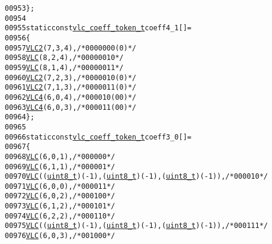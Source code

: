\begin{footnotesize}
\begin{alltt}
00953 \};
00954 
00955 \textcolor{keyword}{static} \textcolor{keyword}{const} \hyperlink{structvlc__coeff__token__t}{vlc_coeff_token_t} coeff4\_1[] = 
00956 \{
00957         \hyperlink{vlc_8h_ad3cda36b9c6132357c7f7de5e52a6c93}{VLC2}(7, 3, 4),   \textcolor{comment}{/* 0000 000(0) */}
00958         \hyperlink{vlc_8h_a7f3572774a720fd9b4bc3b1a0b65082f}{VLC}(8, 2, 4),   \textcolor{comment}{/* 0000 0010 */}
00959         \hyperlink{vlc_8h_a7f3572774a720fd9b4bc3b1a0b65082f}{VLC}(8, 1, 4),   \textcolor{comment}{/* 0000 0011 */}
00960         \hyperlink{vlc_8h_ad3cda36b9c6132357c7f7de5e52a6c93}{VLC2}(7, 2, 3),   \textcolor{comment}{/* 0000 010(0) */}
00961         \hyperlink{vlc_8h_ad3cda36b9c6132357c7f7de5e52a6c93}{VLC2}(7, 1, 3),   \textcolor{comment}{/* 0000 011(0) */}
00962         \hyperlink{vlc_8h_a02cdc921d8f03450b12879e8afb222cb}{VLC4}(6, 0, 4),   \textcolor{comment}{/* 0000 10(00) */}
00963         \hyperlink{vlc_8h_a02cdc921d8f03450b12879e8afb222cb}{VLC4}(6, 0, 3),   \textcolor{comment}{/* 0000 11(00) */}
00964 \};
00965 
00966 \textcolor{keyword}{static} \textcolor{keyword}{const} \hyperlink{structvlc__coeff__token__t}{vlc_coeff_token_t} coeff3\_0[] =
00967 \{
00968         \hyperlink{vlc_8h_a7f3572774a720fd9b4bc3b1a0b65082f}{VLC}(6, 0, 1),    \textcolor{comment}{/* 0000 00 */} 
00969         \hyperlink{vlc_8h_a7f3572774a720fd9b4bc3b1a0b65082f}{VLC}(6, 1, 1),    \textcolor{comment}{/* 0000 01 */} 
00970         \hyperlink{vlc_8h_a7f3572774a720fd9b4bc3b1a0b65082f}{VLC}((\hyperlink{_types_8h_a363e4d606232036a6b89060813c45489}{uint8_t})(-1), (\hyperlink{_types_8h_a363e4d606232036a6b89060813c45489}{uint8_t})(-1), (\hyperlink{_types_8h_a363e4d606232036a6b89060813c45489}{uint8_t})(-1)), \textcolor{comment}{/* 0000 10 */} 
00971         \hyperlink{vlc_8h_a7f3572774a720fd9b4bc3b1a0b65082f}{VLC}(6, 0, 0),    \textcolor{comment}{/* 0000 11 */}
00972         \hyperlink{vlc_8h_a7f3572774a720fd9b4bc3b1a0b65082f}{VLC}(6, 0, 2),    \textcolor{comment}{/* 0001 00 */}
00973         \hyperlink{vlc_8h_a7f3572774a720fd9b4bc3b1a0b65082f}{VLC}(6, 1, 2),    \textcolor{comment}{/* 0001 01 */}
00974         \hyperlink{vlc_8h_a7f3572774a720fd9b4bc3b1a0b65082f}{VLC}(6, 2, 2),    \textcolor{comment}{/* 0001 10 */}
00975         \hyperlink{vlc_8h_a7f3572774a720fd9b4bc3b1a0b65082f}{VLC}((\hyperlink{_types_8h_a363e4d606232036a6b89060813c45489}{uint8_t})(-1), (\hyperlink{_types_8h_a363e4d606232036a6b89060813c45489}{uint8_t})(-1), (\hyperlink{_types_8h_a363e4d606232036a6b89060813c45489}{uint8_t})(-1)), \textcolor{comment}{/* 0001 11 */}
00976         \hyperlink{vlc_8h_a7f3572774a720fd9b4bc3b1a0b65082f}{VLC}(6, 0, 3),    \textcolor{comment}{/* 0010 00 */}

\end{alltt}
\end{footnotesize}
